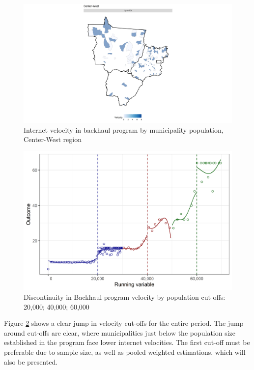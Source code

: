 \documentclass[
  12pt,
]{article}
\begin{document}
\begin{figure}
\centering
\includegraphics{artigo1_files/figure-latex/mapa5-1.png}
\caption{Internet velocity in backhaul program by municipality
population, Center-West region \label{fig:1.5}}
\end{figure}

\begin{figure}
\centering
\includegraphics{artigo1_files/figure-latex/descontinuity-1.png}
\caption{Discontinuity in Backhaul program velocity by population
cut-offs: 20,000; 40,000; 60,000 \label{fig:2}}
\end{figure}

Figure \ref{fig:2} shows a clear jump in velocity cut-offs for the
entire period. The jump around cut-offs are clear, where municipalities
just below the population size established in the program face lower
internet velocities. The first cut-off must be preferable due to sample
size, as well as pooled weighted estimations, which will also be
presented.
\end{document}
